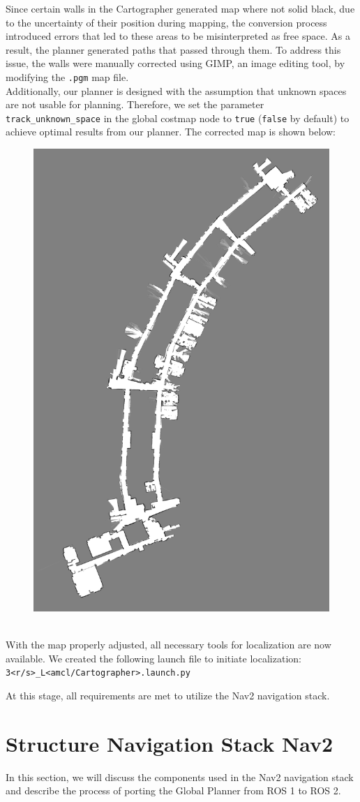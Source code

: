 \newpage
Since certain walls in the Cartographer generated map where not solid black, due to the uncertainty of their position during mapping, the conversion process introduced errors that led to these areas to be misinterpreted as free space. As a result, the planner generated paths that passed through them. To address this issue, the walls were manually corrected using GIMP, an image editing tool, by modifying the \texttt{.pgm} map file.\\ Additionally, our planner is designed with the assumption that unknown spaces are not usable for planning. Therefore, we set the parameter \texttt{track\_unknown\_space} in the global costmap node to  \texttt{true} (\texttt{false} by default)  to achieve optimal results from our planner.
The corrected map is shown below:
\begin{figure}[h]
	\centering
	\includegraphics[width=0.4\linewidth]{img/mapV.png}
\end{figure}\\
With the map properly adjusted, all necessary tools for localization are now available. We created the following launch file to initiate localization:\\
\hspace*{10mm} \texttt{3<r/s>\_L<amcl/Cartographer>.launch.py}

At this stage, all requirements are met to utilize the Nav2 navigation stack.
\section{Structure Navigation Stack Nav2}
In this section, we will discuss the components used in the Nav2 navigation stack and describe the process of porting the Global Planner from ROS 1 to ROS 2.
